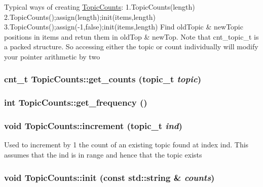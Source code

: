 \label{struct_topic_counts_ae4bd9fecceabe2e87ebd54b81442055f}
Typical ways of creating \hyperlink{struct_topic_counts}{TopicCounts}: 1.TopicCounts(length) 2.TopicCounts();assign(length);init(items,length) 3.TopicCounts();assign(-\/1,false);init(items,length) Find oldTopic \& newTopic positions in items and retun them in oldTop \& newTop. Note that cnt\_\-topic\_\-t is a packed structure. So accessing either the topic or count individually will modify your pointer arithmetic by two \hypertarget{struct_topic_counts_a1289a13a2d59db891d9775acab93cc1e}{
\subsubsection[{get\_\-counts}]{\setlength{\rightskip}{0pt plus 5cm}cnt\_\-t TopicCounts::get\_\-counts (topic\_\-t {\em topic})}}
\label{struct_topic_counts_a1289a13a2d59db891d9775acab93cc1e}
\hypertarget{struct_topic_counts_aaab5b0bf2f9051671d4a53ac0b60e1a5}{
\subsubsection[{get\_\-frequency}]{\setlength{\rightskip}{0pt plus 5cm}int TopicCounts::get\_\-frequency ()}}
\label{struct_topic_counts_aaab5b0bf2f9051671d4a53ac0b60e1a5}
\hypertarget{struct_topic_counts_a326672023fd147088bd27a4a5f33c0c1}{
\subsubsection[{increment}]{\setlength{\rightskip}{0pt plus 5cm}void TopicCounts::increment (topic\_\-t {\em ind})}}
\label{struct_topic_counts_a326672023fd147088bd27a4a5f33c0c1}
Used to increment by 1 the count of an existing topic found at index ind. This assumes that the ind is in range and hence that the topic exists \hypertarget{struct_topic_counts_a1b625b3b8e01723b1cd79ac436b50b3e}{
\subsubsection[{init}]{\setlength{\rightskip}{0pt plus 5cm}void TopicCounts::init (const std::string \& {\em counts})}}
